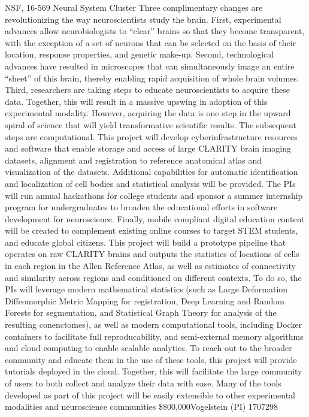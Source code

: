 \documentclass[10pt,colorlinks=true,urlcolor=blue]{moderncv}
\begin{document}
%
    {NSF, 16-569 Neural System Cluster}%
    {Three complimentary changes are revolutionizing the way neuroscientists study the brain. First, experimental advances allow neurobiologists to ``clear'' brains so that they become transparent, with the exception of a set of neurons that can be selected on the basis of their location, response properties, and genetic make-up. Second, technological advances have resulted in microscopes that can simultaneously image an entire ``sheet'' of this brain, thereby enabling rapid acquisition of whole brain volumes. Third, researchers are taking steps to educate neuroscientists to acquire these data. Together, this will result in a massive upswing in adoption of this experimental modality. However, acquiring the data is one step in the upward spiral of science that will yield transformative scientific results. The subsequent steps are computational. This project will develop cyberinfrastructure resources and software that enable storage and access of large CLARITY brain imaging datasets, alignment and registration to reference anatomical atlas and visualization of the datasets. Additional capabilities for automatic identification and localization of cell bodies and statistical analysis will be provided. The PIs will run annual hackathons for college students and sponsor a summer internship program for undergraduates to broaden the educational efforts in software development for neuroscience. Finally, mobile compliant digital education content will be created to complement existing online courses to target STEM students, and educate global citizens.
%
This project will build a prototype pipeline that operates on raw CLARITY brains and outputs the statistics of locations of cells in each region in the Allen Reference Atlas, as well as estimates of connectivity and similarity across regions and conditioned on different contexts. To do so, the PIs will leverage modern mathematical statistics (such as Large Deformation Diffeomorphic Metric Mapping for registration, Deep Learning and Random Forests for segmentation, and Statistical Graph Theory for analysis of the resulting conenctomes), as well as modern computational tools, including Docker containers to facilitate full reproducability, and semi-external memory algorithms and cloud computing to enable scalable analytics. To reach out to the broader community and educate them in the use of these tools, this project will provide tutorials deployed in the cloud. Together, this will facilitate the large community of users to both collect and analyze their data with ease. Many of the tools developed as part of this project will be easily extensible to other experimental modalities and neuroscience communities
    }
    {\$800,000}{Vogelstein (PI) 1707298}{}
\end{document}
